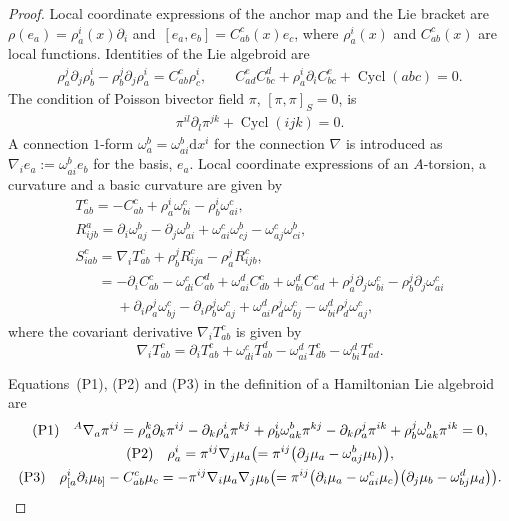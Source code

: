\documentclass[pdftex]{sigma}
\numberwithin{equation}{section}
\newcommand{\rd}{\mathrm{d}}
\begin{document}
\begin{proof}
Local coordinate expressions of the anchor map and the Lie bracket are
$\rho(e_a)= \rho^i_a(x) \partial_i$ and~${[e_a, e_b ] = C_{ab}^c(x) e_c}$, where $\rho^i_a(x)$ and $C_{ab}^c(x)$
are local functions.
Identities of the Lie algebroid are
\begin{gather}%
 \rho_a^j \partial_j \rho_{b}^i - \rho_b^j \partial_j \rho_{a}^i = C_{ab}^c \rho_c^i,
\qquad
 C_{ad}^e C_{bc}^d + \rho_a^i \partial_i C_{bc}^e + \operatorname{Cycl}(abc) = 0.\label{LAidentity1}
\end{gather}
The condition of Poisson bivector field $\pi$, $[\pi, \pi]_S=0$, is
\begin{gather}
 \pi^{il} \partial_l \pi^{jk} + \operatorname{Cycl}(ijk) = 0.
\label{Poissonidentity}
\end{gather}
A connection $1$-form $\omega_a^b = \omega_{ai}^b \rd x^i$
for the connection $\nabla$ is introduced as
$\nabla_i e_a := \omega_{ai}^b e_b$ for the basis, $e_a$.
Local coordinate expressions of an $A$-torsion,
a curvature and a basic curvature are given by
\begin{gather}%
T_{ab}^c =
- C_{ab}^c + \rho_a^i \omega_{bi}^c - \rho_b^i \omega_{ai}^c,
\label{lcAtosion}
\\
R_{ijb}^a =
\partial_i \omega_{aj}^b - \partial_j \omega_{ai}^b
+ \omega_{ai}^c \omega_{cj}^b - \omega_{aj}^c \omega_{ci}^b,
\nonumber
\\
S_{iab}^{c} =
\nabla_i T_{ab}^c + \rho_b^j R_{ija}^c - \rho_a^j R_{ijb}^c,
 \nonumber \\
\phantom{S_{iab}^{c} }{}= - \partial_i C^c_{ab} - \omega_{di}^c C_{ab}^d
+ \omega_{ai}^d C_{db}^c + \omega_{bi}^d C_{ad}^c
+ \rho_a^j \partial_j \omega_{bi}^c
- \rho_b^j \partial_j \omega_{ai}^c
\nonumber \\
\phantom{S_{iab}^{c} =}{}+ \partial_i \rho_a^j \omega_{bj}^c
- \partial_i \rho_b^j \omega_{aj}^c
+ \omega_{ai}^d \rho_d^j \omega_{bj} ^c
- \omega_{bi}^d \rho_d^j \omega_{aj} ^c,
\label{lcbasiccurv}
\end{gather}
where the covariant derivative $\nabla_i T_{ab}^c$ is given by
\[
\nabla_i T_{ab}^c =
\partial_i T_{ab}^c
+ \omega_{di}^c T_{ab}^d - \omega_{ai}^d T_{db}^c - \omega_{bi}^d T_{ad}^c.
\]

Equations~(P1), (P2) and (P3) in the definition of a Hamiltonian Lie algebroid are
\begin{gather}
{\rm (P1)} \quad {}^A \nabla_a \pi^{ij}
= \rho_a^k \partial_k \pi^{ij} - \partial_k \rho^i_a \pi^{kj}
+ \rho^i_b \omega^b_{ak} \pi^{kj}
- \partial_k \rho^j_a \pi^{ik}
+ \rho^j_b \omega^b_{ak} \pi^{ik} = 0,\nonumber\\
{\rm (P2)} \quad
\rho^i_a = \pi^{ij} \nabla_j \mu_a
\bigl(= \pi^{ij} \bigl(\partial_j \mu_a - \omega_{aj}^b \mu_b\bigr)\bigr),
\label{Pms12}\\
{\rm (P3)}\quad
\rho^i_{[a} \partial_i \mu_{b]} - C_{ab}^c \mu_c
= - \pi^{ij} \nabla_i \mu_a \nabla_j \mu_b
\bigl(= \pi^{ij} \bigl(\partial_i \mu_a - \omega_{ai}^c \mu_c\bigr)
\bigl(\partial_j \mu_b - \omega_{bj}^d \mu_d\bigr)\bigr).
\label{Pms13}
\end{gather}


\end{proof}
\end{document}
